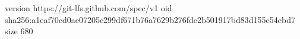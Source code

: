 version https://git-lfs.github.com/spec/v1
oid sha256:a1eaf70cd0ae07205c299df671b76a7629b276fde2b501917bd83d155e54ebd7
size 680
